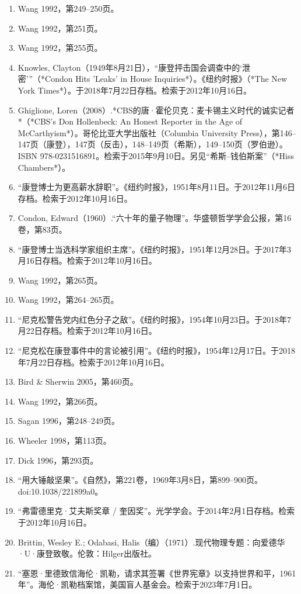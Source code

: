 \begin{enumerate}
\item Wang 1992，第249–250页。
\item Wang 1992，第251页。
\item Wang 1992，第255页。
\item Knowles, Clayton（1949年8月21日），“康登抨击国会调查中的‘泄密’”（*Condon Hits 'Leaks' in House Inquiries*）。《纽约时报》（*The New York Times*）。于2018年7月22日存档。检索于2012年10月16日。
\item Ghiglione, Loren（2008）.*CBS的唐·霍伦贝克：麦卡锡主义时代的诚实记者*（*CBS's Don Hollenbeck: An Honest Reporter in the Age of McCarthyism*）。哥伦比亚大学出版社（Columbia University Press），第146–147页（康登），147页（反击），148–149页（希斯），149–150页（罗伯逊）。ISBN 978-0231516891。检索于2015年9月10日。另见“希斯–钱伯斯案”（*Hiss Chambers*）。
\item “康登博士为更高薪水辞职”。《纽约时报》，1951年8月11日。于2012年11月6日存档。检索于2012年10月16日。
\item Condon, Edward（1960）.“六十年的量子物理”。华盛顿哲学学会公报，第16卷，第83页。
\item “康登博士当选科学家组织主席”。《纽约时报》，1951年12月28日。于2017年3月16日存档。检索于2012年10月16日。
\item Wang 1992，第265页。
\item Wang 1992，第264–265页。
\item “尼克松警告党内红色分子之敌”。《纽约时报》，1954年10月23日。于2018年7月22日存档。检索于2012年10月16日。
\item “尼克松在康登事件中的言论被引用”。《纽约时报》，1954年12月17日。于2018年7月22日存档。检索于2012年10月16日。
\item Bird & Sherwin 2005，第460页。
\item Wang 1992，第266页。
\item Sagan 1996，第248–249页。
\item Wheeler 1998，第113页。
\item Dick 1996，第293页。
\item “用大锤敲坚果”。《自然》，第221卷，1969年3月8日，第899–900页。doi:10.1038/221899a0。
\item “弗雷德里克·艾夫斯奖章 / 奎因奖”。光学学会。于2014年2月1日存档。检索于2012年10月16日。
\item Brittin, Wesley E.; Odabasi, Halis（编）（1971）.现代物理专题：向爱德华·U·康登致敬。伦敦：Hilger出版社。
\item “塞恩·里德致信海伦·凯勒，请求其签署《世界宪章》以支持世界和平，1961年”。海伦·凯勒档案馆，美国盲人基金会。检索于2023年7月1日。

\end{enumerate}
